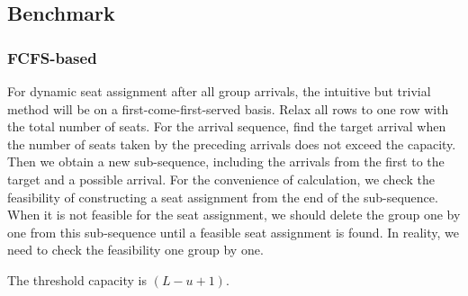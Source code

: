 





\subsection{Benchmark}
 

\subsubsection{FCFS-based}\label{FCFS-based}

For dynamic seat assignment after all group arrivals, the intuitive but trivial method will be on a first-come-first-served basis. Relax all rows to one row with the total number of seats. For the arrival sequence, find the target arrival when the number of seats taken by the preceding arrivals does not exceed the capacity.
Then we obtain a new sub-sequence, including the arrivals from the first to the target and a possible arrival. For the convenience of calculation, we check the feasibility of constructing a seat assignment from the end of the sub-sequence. When it is not feasible for the seat assignment, we should delete the group one by one from this sub-sequence until a feasible seat assignment is found. In reality, we need to check the feasibility one group by one.

The threshold capacity is $(L -u +1)$.


